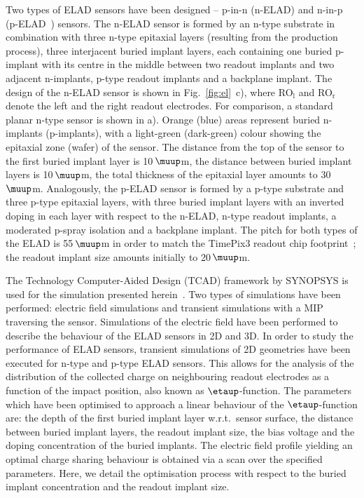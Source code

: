 \documentclass[a4paper,11pt]{article}
\begin{document}
Two types of ELAD sensors have been designed -- p-in-n (n-ELAD) and n-in-p (p-ELAD~\cite{elad}) sensors.
The n-ELAD sensor is formed by an n-type substrate in combination with three n-type epitaxial layers (resulting from the production process),
 three interjacent buried implant layers, each containing one buried p-implant with its centre in the middle between two readout implants and two adjacent n-implants,
 p-type readout implants and a backplane implant.
The design of the n-ELAD sensor is shown in Fig.~\ref{fig:el}~c), where RO$_{\textrm{l}}$ and RO$_{\textrm{r}}$ denote the left and the right readout electrodes.
For comparison, a standard planar n-type sensor is shown in a).
Orange (blue) areas represent buried n-implants (p-implants), with a light-green (dark-green) colour showing the epitaxial zone (wafer) of the sensor. 
The distance from the top of the sensor to the first buried implant layer is 10\,$\muup$m, the distance between buried implant layers is 10\,$\muup$m, the total thickness of the epitaxial layer amounts to 30\,$\muup$m.
Analogously, the p-ELAD sensor is formed by a p-type substrate and three p-type epitaxial layers,
 with three buried implant layers with an inverted doping in each layer with respect to the n-ELAD,
 n-type readout implants, a moderated p-spray isolation and a backplane implant.
The pitch for both types of the ELAD is 55\,$\muup$m in order to match the TimePix3 readout chip footprint~\cite{tp3}; the readout implant size amounts initially to 20\,$\muup$m.

The Technology Computer-Aided Design (TCAD) framework by SYNOPSYS is used for the simulation presented herein~\cite{syn}.
Two types of simulations have been performed: electric field simulations and transient simulations with a MIP traversing the sensor.
Simulations of the electric field have been performed to describe the behaviour of the ELAD sensors in 2D and 3D.
In order to study the performance of ELAD sensors, transient simulations of 2D geometries have been executed for n-type and p-type ELAD sensors.
This allows for the analysis of the distribution of the collected charge on neighbouring readout electrodes as a function of the impact position, also known as $\etaup$-function.
The parameters which have been optimised to approach a linear behaviour of the $\etaup$-function are: the depth of the first buried implant layer w.r.t.\ sensor surface, the distance between buried implant layers,
 the readout implant size, the bias voltage and the doping concentration of the buried implants. 
The electric field profile yielding an optimal charge sharing behaviour is obtained via a scan over the specified parameters.
Here, we detail the optimisation process with respect to the buried implant concentration and the readout implant size.
\end{document}
